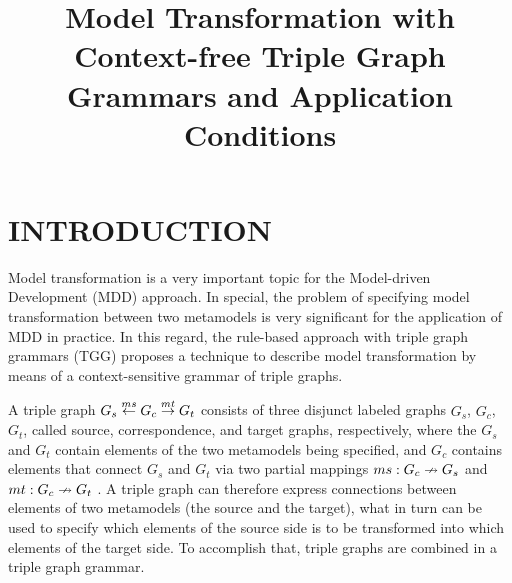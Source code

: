 \documentclass[a4paper,twoside]{article}
\begin{document}
\title{Model Transformation with Context-free Triple Graph Grammars and Application Conditions}



\abstract{}

\onecolumn \maketitle \normalsize \vfill

\section{\uppercase{Introduction}}

\noindent Model transformation is a very important topic for the Model-driven Development (MDD) approach. In special, the problem of specifying model transformation between two metamodels is very significant for the application of MDD in practice. In this regard, the rule-based approach with triple graph grammars (TGG) proposes a technique to describe model transformation by means of a context-sensitive grammar of triple graphs.

A triple graph $G_s \overset{ms}{\leftarrow} G_c \overset{mt}{\rightarrow} G_t$ consists of three disjunct labeled graphs $G_s$, $G_c$, $G_t$, called source, correspondence, and target graphs, respectively, where the $G_s$ and $G_t$ contain elements of the two metamodels being specified, and $G_c$ contains elements that connect $G_s$ and $G_t$ via two partial mappings $ms: G_c \nrightarrow G_s$ and $mt: G_c \nrightarrow G_t$ \cite{schurr1994specification}. A triple graph can therefore express connections between elements of two metamodels (the source and the target), what in turn can be used to specify which elements of the source side is to be transformed into which elements of the target side. To accomplish that, triple graphs are combined in a triple graph grammar.
\end{document}
